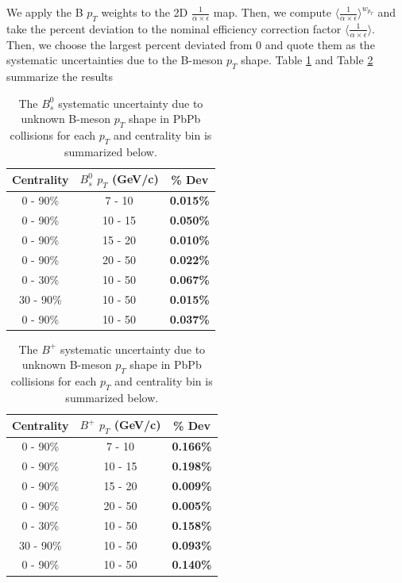 We apply the B $p_T$ weights to the 2D $\frac{1}{\alpha \times \epsilon}$ map. Then, we compute $\langle\frac{1}{\alpha \times \epsilon}\rangle^{w_{p_T}}$ and take the percent deviation to the nominal efficiency correction factor $\langle\frac{1}{\alpha \times \epsilon}\rangle$. Then, we choose the largest percent deviated from 0 and quote them as the systematic uncertainties due to the B-meson $p_T$ shape. Table \ref{BsPTShape} and Table \ref{BPPTShape} summarize the results 


\begin{table}[h]
\begin{center}
\caption{The $B^0_s$ systematic uncertainty due to unknown B-meson $p_T$ shape in PbPb collisions for each $p_T$ and centrality bin is summarized below.}
\vspace{1em}
\label{BsPTShape}
  \begin{tabular}{| c | c |c |}
    \hline
     Centrality & $B^0_s$ $p_T$ (GeV/c) & \% Dev \\
    \hline
    \hline
0 - 90\% & 7 - 10 &   \textbf{0.015\% }     \\ 
0 - 90\% & 10 - 15 & \textbf{0.050\% }    \\ 
0 - 90\% & 15 - 20 &  \textbf{0.010\% }     \\ 
0 - 90\% & 20 - 50 &  \textbf{0.022\% }    \\ 
0 - 30\% & 10 - 50 &   \textbf{0.067\% }  \\ 
30 - 90\% & 10 - 50 & \textbf{0.015\% }    \\ 
0 - 90\% & 10 - 50 &  \textbf{0.037\% }   \\ 
    \hline
    \hline
\end{tabular}
\end{center}
\end{table}



\begin{table}[h]
\begin{center}
\caption{The $B^+$ systematic uncertainty due to unknown B-meson $p_T$ shape in PbPb collisions for each $p_T$ and centrality bin is summarized below.}
\vspace{1em}
\label{BPPTShape}
  \begin{tabular}{| c | c |c |}
    \hline
     Centrality & $B^+$ $p_T$ (GeV/c) & \% Dev \\
    \hline
    \hline
0 - 90\% & 7 - 10 &   \textbf{0.166\% }     \\ 
0 - 90\% & 10 - 15 & \textbf{0.198\% }    \\ 
0 - 90\% & 15 - 20 &  \textbf{0.009\% }     \\ 
0 - 90\% & 20 - 50 &  \textbf{0.005\% }    \\ 
0 - 30\% & 10 - 50 &   \textbf{0.158\% }  \\ 
30 - 90\% & 10 - 50 & \textbf{0.093\% }    \\ 
0 - 90\% & 10 - 50 &  \textbf{0.140\% }   \\ 
    \hline
    \hline
\end{tabular}
\end{center}
\end{table}

